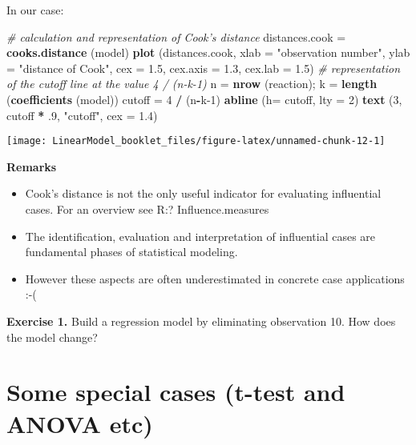 \documentclass[
]{article}
\newenvironment{Shaded}{\begin{snugshade}}{\end{snugshade}}
\newcommand{\CommentTok}[1]{\textcolor[rgb]{0.56,0.35,0.01}{\textit{#1}}}
\newcommand{\DataTypeTok}[1]{\textcolor[rgb]{0.13,0.29,0.53}{#1}}
\newcommand{\DecValTok}[1]{\textcolor[rgb]{0.00,0.00,0.81}{#1}}
\newcommand{\FloatTok}[1]{\textcolor[rgb]{0.00,0.00,0.81}{#1}}
\newcommand{\KeywordTok}[1]{\textcolor[rgb]{0.13,0.29,0.53}{\textbf{#1}}}
\newcommand{\NormalTok}[1]{#1}
\newcommand{\OperatorTok}[1]{\textcolor[rgb]{0.81,0.36,0.00}{\textbf{#1}}}
\newcommand{\StringTok}[1]{\textcolor[rgb]{0.31,0.60,0.02}{#1}}
\providecommand{\tightlist}{%
  \setlength{\itemsep}{0pt}\setlength{\parskip}{0pt}}
\begin{document}
In our case:

\begin{Shaded}
\begin{Highlighting}[]
\CommentTok{# calculation and representation of Cook's distance}
\NormalTok{distances.cook =}\StringTok{ }\KeywordTok{cooks.distance}\NormalTok{ (model)}
\KeywordTok{plot}\NormalTok{ (distances.cook, }\DataTypeTok{xlab =} \StringTok{"observation number"}\NormalTok{, }\DataTypeTok{ylab =} \StringTok{"distance of Cook"}\NormalTok{, }\DataTypeTok{cex =} \FloatTok{1.5}\NormalTok{, }\DataTypeTok{cex.axis =} \FloatTok{1.3}\NormalTok{, }\DataTypeTok{cex.lab =} \FloatTok{1.5}\NormalTok{)}
\CommentTok{# representation of the cutoff line at the value 4 / (n-k-1)}
\NormalTok{n =}\StringTok{ }\KeywordTok{nrow}\NormalTok{ (reaction); k =}\StringTok{ }\KeywordTok{length}\NormalTok{ (}\KeywordTok{coefficients}\NormalTok{ (model))}
\NormalTok{cutoff =}\StringTok{ }\DecValTok{4} \OperatorTok{/}\StringTok{ }\NormalTok{(n}\OperatorTok{-}\NormalTok{k}\DecValTok{-1}\NormalTok{)}
\KeywordTok{abline}\NormalTok{ (}\DataTypeTok{h=}\NormalTok{ cutoff, }\DataTypeTok{lty =} \DecValTok{2}\NormalTok{)}
\KeywordTok{text}\NormalTok{ (}\DecValTok{3}\NormalTok{, cutoff }\OperatorTok{*}\StringTok{ }\FloatTok{.9}\NormalTok{, }\StringTok{"cutoff"}\NormalTok{, }\DataTypeTok{cex =} \FloatTok{1.4}\NormalTok{)}
\end{Highlighting}
\end{Shaded}

\begin{center}\texttt{[image: LinearModel\_booklet\_files/figure-latex/unnamed-chunk-12-1]} \end{center}

\textbf{Remarks}

\begin{itemize}
\tightlist
\item
  Cook's distance is not the only useful indicator for evaluating
  influential cases. For an overview see R:? Influence.measures
\item
  The identification, evaluation and interpretation of influential cases
  are fundamental phases of statistical modeling.
\item
  However these aspects are often underestimated in concrete case
  applications :-(
\end{itemize}

\textbf{Exercise 1.} Build a regression model by eliminating observation
10. How does the model change?

\hypertarget{some-special-cases-t-test-and-anova-etc}{%
\section{Some special cases (t-test and ANOVA
etc)}\label{some-special-cases-t-test-and-anova-etc}}
\end{document}
